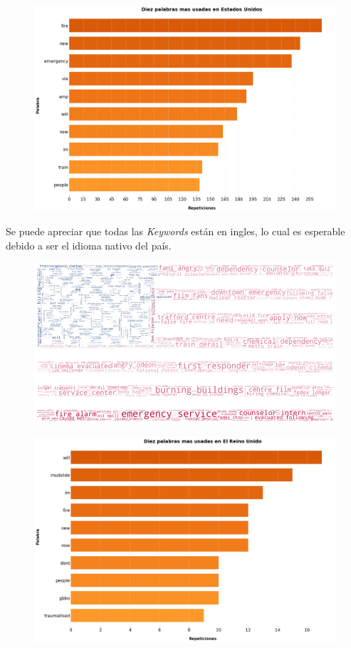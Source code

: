 \documentclass[titlepage,a4paper]{article}
\begin{document}
    \begin{figure}[H]
    \centering
    \includegraphics[width=1\textwidth]{graficos/Analisis de Locacion/10_palabras_mas_usadas_usa.png}
    \caption{}
    \end{figure}
    Se puede apreciar que todas las \textit{Keywords} están en ingles, lo cual es esperable debido a ser el idioma nativo del país.

    \begin{figure}[H]
    \centering
    \includegraphics[width=1\textwidth]{graficos/Analisis de Locacion/bandera_usa.png}
    \caption{}
    \end{figure}
    
    \begin{figure}[H]
    \centering
    \includegraphics[width=1\textwidth]{graficos/Analisis de Locacion/10_palabras_mas_usadas_uk.png}
    \caption{}
    \end{figure}
    
\end{document}
